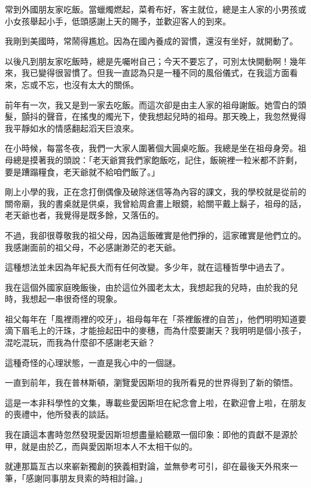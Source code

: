
\begin{acknowledgement}

常到外國朋友家吃飯。當蠟燭燃起，菜肴布好，客主就位，總是主人家的小男孩或小女孩舉起小手，低頭感謝上天的賜予，並歡迎客人的到來。

我剛到美國時，常鬧得尷尬。因為在國內養成的習慣，還沒有坐好，就開動了。

以後凡到朋友家吃飯時，總是先囑咐自己；今天不要忘了，可別太快開動啊！幾年來，我已變得很習慣了。但我一直認為只是一種不同的風俗儀式，在我這方面看來，忘或不忘，也沒有太大的關係。

前年有一次，我又是到一家去吃飯。而這次卻是由主人家的祖母謝飯。她雪白的頭髮，顫抖的聲音，在搖曳的燭光下，使我想起兒時的祖母。那天晚上，我忽然覺得我平靜如水的情感翻起滔天巨浪來。

在小時候，每當冬夜，我們一大家人圍著個大圓桌吃飯。我總是坐在祖母身旁。祖母總是摸著我的頭說：「老天爺賞我們家飽飯吃，記住，飯碗裡一粒米都不許剩，要是蹧蹋糧食，老天爺就不給咱們飯了。」

剛上小學的我，正在念打倒偶像及破除迷信等為內容的課文，我的學校就是從前的關帝廟，我的書桌就是供桌，我曾給周倉畫上眼鏡，給關平戴上鬍子，祖母的話，老天爺也者，我覺得是既多餘，又落伍的。

不過，我卻很尊敬我的祖父母，因為這飯確實是他們掙的，這家確實是他們立的。我感謝面前的祖父母，不必感謝渺茫的老天爺。

這種想法並未因為年紀長大而有任何改變。多少年，就在這種哲學中過去了。

我在這個外國家庭晚飯後，由於這位外國老太太，我想起我的兒時，由於我的兒時，我想起一串很奇怪的現象。

祖父每年在「風裡雨裡的咬牙」，祖母每年在「茶裡飯裡的自苦」，他們明明知道要滴下眉毛上的汗珠，才能撿起田中的麥穗，而為什麼要謝天？我明明是個小孩子，混吃混玩，而我為什麼卻不感謝老天爺？

這種奇怪的心理狀態，一直是我心中的一個謎。

一直到前年，我在普林斯頓，瀏覽愛因斯坦的我所看見的世界得到了新的領悟。

這是一本非科學性的文集，專載些愛因斯坦在紀念會上啦，在歡迎會上啦，在朋友的喪禮中，他所發表的談話。

我在讀這本書時忽然發現愛因斯坦想盡量給聽眾一個印象：即他的貢獻不是源於甲，就是由於乙，而與愛因斯坦本人不太相干似的。

就連那篇亙古以來嶄新獨創的狹義相對論，並無參考可引，卻在最後天外飛來一筆，「感謝同事朋友貝索的時相討論。」


\end{acknowledgement}
